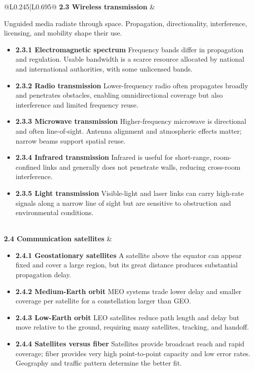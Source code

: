 \documentclass[10pt,letterpaper]{article}
\begin{document}
\begin{longtable}{@{}L{0.245\textwidth}|L{0.695\textwidth}@{}}
\textbf{2.3 Wireless transmission} & \begin{minipage}[t]{\linewidth}\raggedright Unguided media radiate through space. Propagation, directionality, interference, licensing, and mobility shape their use.\par\begin{itemize}\item \textbf{2.3.1 Electromagnetic spectrum} Frequency bands differ in propagation and regulation. Usable bandwidth is a scarce resource allocated by national and international authorities, with some unlicensed bands.\item \textbf{2.3.2 Radio transmission} Lower-frequency radio often propagates broadly and penetrates obstacles, enabling omnidirectional coverage but also interference and limited frequency reuse.\item \textbf{2.3.3 Microwave transmission} Higher-frequency microwave is directional and often line-of-sight. Antenna alignment and atmospheric effects matter; narrow beams support spatial reuse.\item \textbf{2.3.4 Infrared transmission} Infrared is useful for short-range, room-confined links and generally does not penetrate walls, reducing cross-room interference.\item \textbf{2.3.5 Light transmission} Visible-light and laser links can carry high-rate signals along a narrow line of sight but are sensitive to obstruction and environmental conditions.\end{itemize}\end{minipage} \\ \hline
{}\textbf{2.4 Communication satellites} & \begin{minipage}[t]{\linewidth}\raggedright \begin{itemize}\item \textbf{2.4.1 Geostationary satellites} A satellite above the equator can appear fixed and cover a large region, but its great distance produces substantial propagation delay.\item \textbf{2.4.2 Medium-Earth orbit} MEO systems trade lower delay and smaller coverage per satellite for a constellation larger than GEO.\item \textbf{2.4.3 Low-Earth orbit} LEO satellites reduce path length and delay but move relative to the ground, requiring many satellites, tracking, and handoff.\item \textbf{2.4.4 Satellites versus fiber} Satellites provide broadcast reach and rapid coverage; fiber provides very high point-to-point capacity and low error rates. Geography and traffic pattern determine the better fit.\end{itemize}\end{minipage} \\ \hline

\end{longtable}
\end{document}
